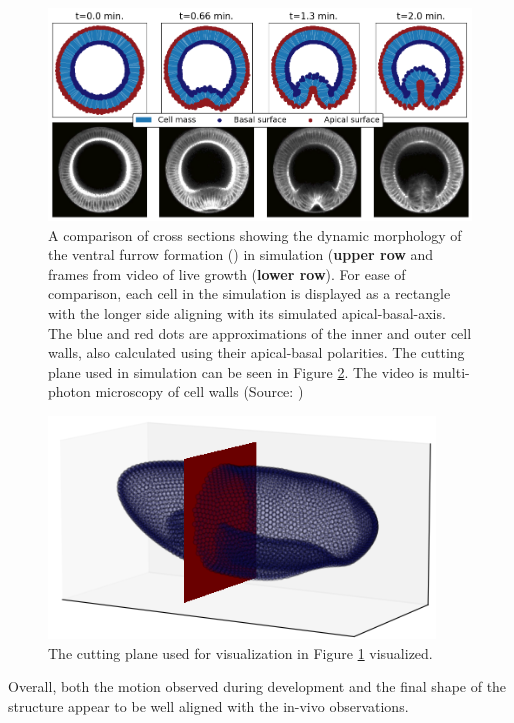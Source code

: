 \begin{figure}[H]
    \centering
    \includegraphics[width=1\linewidth]{chapters/Results/figures/VF_comparison.png}
    \caption{A comparison of cross sections showing the dynamic morphology of the ventral furrow formation () in simulation (\textbf{upper row} and frames from video of live growth (\textbf{lower row}). For ease of comparison, each cell in the simulation is displayed as a rectangle with the longer side aligning with its simulated apical-basal-axis. The blue and red dots are approximations of the inner and outer cell walls, also calculated using their apical-basal polarities. The cutting plane used in simulation can be seen in Figure \ref{fig:cutplane}. The video is multi-photon microscopy of cell walls (Source: )}
    \label{fig:VFComparison}
\end{figure}
\begin{figure}
    \centering
    \includegraphics[width=0.8\linewidth]{chapters/Results/figures/planecut2.png}
    \caption{The cutting plane used for visualization in Figure \ref{fig:VFComparison} visualized.}
    \label{fig:cutplane}
\end{figure}
Overall, both the motion observed during development and the final shape of the structure appear to be well aligned with the in-vivo observations.\\

